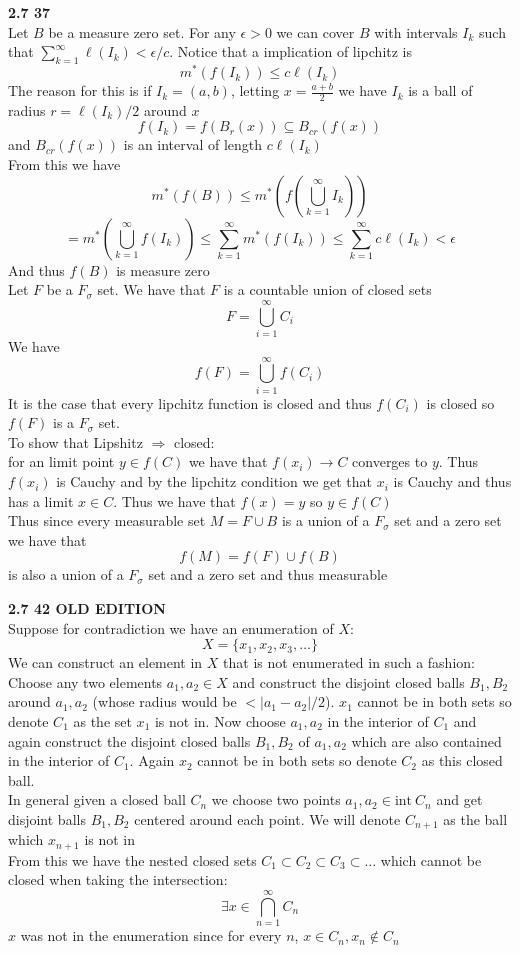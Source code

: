 \documentclass[12pt]{article}
\newenvironment{ques}[1]{\textbf{#1}\vspace{1 mm}\\ }{\bigskip}
\theoremstyle{definition}
\renewcommand{\l}{\left }
\renewcommand{\r}{\right }
\renewcommand{\i}{\text{int} \ }
\renewcommand{\-}{\backslash}
\begin{document}
\begin{ques}{2.7 37}
	Let $B$ be a measure zero set. For any $\epsilon > 0$ we can cover $B$ with
	intervals $I_k$ such that $\sum_{k =1} ^\infty \ell(I_k) < \epsilon / c$.
	Notice that a implication of lipchitz is
	$$m^*(f(I_k)) \leq c \ell(I_k)$$
	The reason for this is if $I_k = (a,b)$, letting $x = \frac{a + b}2$ we
	have $I_k$ is a ball of radius $r = \ell(I_k)/2$ around $x$
	$$f(I_k) = f(B_r(x)) \subseteq B_{cr}(f(x))$$
	and $B_{cr}(f(x))$ is an interval of length $c\ell(I_k)$
	\\
	From this we have
	$$m^*(f(B)) \leq m^*\l(f\l( \bigcup_{k=1}^\infty I_k \r)\r)$$
	$$= m^*\l( \bigcup_{k=1}^\infty f\l( I_k \r)\r) \leq \sum_{k=1}^\infty
	m^*(f(I_k)) \leq \sum_{k=1}^\infty c \ell(I_k) < \epsilon$$
	And thus $f(B)$ is measure zero\\
	Let $F$ be a $F_\sigma$ set. We have that $F$ is a countable union of closed sets
	$$F = \bigcup_{i=1}^\infty C_i$$
	We have
	$$f(F) = \bigcup_{i=1}^\infty f(C_i)$$
	It is the case that every lipchitz function is closed and thus $f(C_i)$ is
	closed so $f(F)$ is a $F_\sigma$ set.\\
	To show that Lipshitz $\Rightarrow$ closed:\\
	for an limit point $y \in f(C)$ we have that $f(x_i) \to C$ converges to
	$y$. Thus $f(x_i)$ is Cauchy and by the lipchitz condition we get that
	$x_i$ is Cauchy and thus has a limit $x \in C$. Thus we have that $f(x) = y$ so
	$y \in f(C)$\\
	Thus since every measurable set $M = F \cup B$ is a union of a
	$F_\sigma$ set and a zero set we have that
	$$f(M) = f(F) \cup f(B)$$
	is also a union of a $F_\sigma$ set and a zero set and thus measurable

\end{ques}

\begin{ques}{2.7 42 OLD EDITION}
	Suppose for contradiction we have an enumeration of $X:$
	$$X = \{x_1, x_2, x_3, \dots \}$$
	We can construct an element in $X$ that is not enumerated in such a fashion:\\
	Choose any two elements $a_1, a_2 \in X$ and construct the disjoint closed balls
	$B_1, B_2$ around $a_1, a_2$ (whose radius would be $< |a_1-a_2|/2$). $x_1$
	cannot be in both sets so denote $C_1$ as the set $x_1$ is not in. Now
	choose $a_1,a_2$ in the interior of $C_1$ and again construct the disjoint
	closed balls $B_1, B_2$ of $a_1,a_2$ which are also contained in the
	interior of $C_1$. Again $x_2$ cannot be in both sets so denote $C_2$ as
	this closed ball.\\
	In general given a closed ball $C_n$ we choose two
	points $a_1,a_2 \in \i C_n$ and get disjoint balls $B_1, B_2$ centered
	around each point. We will denote $C_{n+1}$ as the ball which $x_{n+1}$ is
	not in\\
	From this we have the nested closed sets $C_1 \subset C_2 \subset C_3
	\subset \dots$ which cannot be closed when taking the intersection:
	$$\exists x \in \bigcap_{n=1}^\infty C_n$$
	$x$ was not in the enumeration since for every $n$, $x \in C_n, x_n \notin C_n$
\end{ques}
\end{document}
